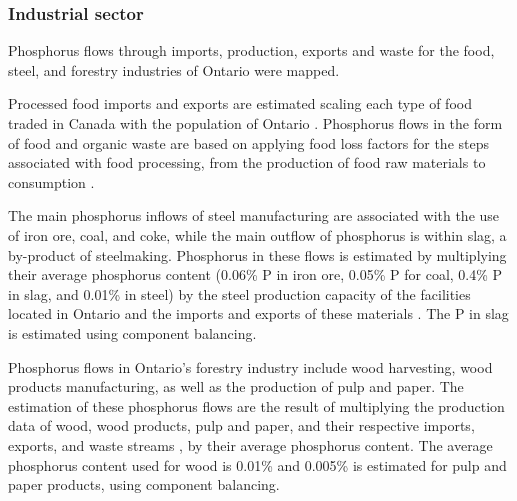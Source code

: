 \documentclass[]{elsarticle}
\begin{document}
\subsubsection{Industrial sector}
Phosphorus flows through imports, production, exports and waste for the food, steel, and forestry industries of Ontario were mapped.

Processed food imports and exports
are estimated scaling each type of food 
traded in Canada \citep{TradeDataOnlineCanada}
with the population of Ontario \citep{PopulationCanada}.
Phosphorus flows in the form of food and organic waste are based on applying food loss factors for the steps associated with food processing, from the production of food raw materials to consumption \citep{FoodLossesFAO}.

The main phosphorus inflows of steel manufacturing are associated with the use of iron ore, coal, and coke, while the
main outflow of phosphorus is within slag, a by-product of steelmaking. 
Phosphorus in these flows is estimated by multiplying their average phosphorus content (0.06\% P in iron ore, 0.05\% P for coal, 0.4\% P in slag, and 0.01\% in steel) \citep{yokoyama2007separation} by the steel production capacity of the facilities located in Ontario \citep{CheminfoServices, AlgomaSteel, Stelco, PFlows_Ontario} and the imports and exports of these materials \citep{WorldIntegratedTradeSolution, InterprovincialImportsExports}. The P in slag is estimated using component balancing.

Phosphorus flows in Ontario's forestry industry include wood harvesting, wood products manufacturing, as well as the production of pulp and paper. The estimation of these phosphorus flows are the result of multiplying the production data of wood, wood products, pulp and paper, and their respective imports, exports, and waste streams \citep{CanadianForestServiceStatistics, InterprovincialImportsExports}, by their average phosphorus content.
The average phosphorus content used for wood is 0.01\% \citep{sardans2013tree} and 0.005\% is estimated for pulp and paper products, using component balancing.
\end{document}
